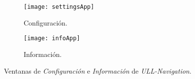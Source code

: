 \begin{figure}[h]
    \hspace*{\fill}%
    \begin{subfigure}[h]{0.35\linewidth}
    \texttt{[image: settingsApp]}
    \caption{Configuración.}
    \label{fig:settingsApp}
    \end{subfigure}
    \hfill%
    \begin{subfigure}[h]{0.35\linewidth}
    \texttt{[image: infoApp]}
    \caption{Información.}
    \label{fig:infoApp}
    \end{subfigure}%
    \caption{Ventanas de \textit{Configuración} e \textit{Información} de \textit{ULL-Navigation}.}
    \hspace*{\fill}%
\end{figure}


















% 
